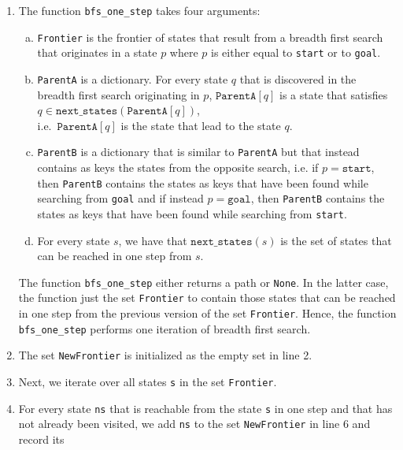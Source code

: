 \begin{enumerate}
\item The function \texttt{bfs\_one\_step} takes four arguments:
      \begin{enumerate}[(a)]
      \item \texttt{Frontier} is the frontier of states that result from a breadth first search
            that originates in a state $p$ where $p$ is either equal to \texttt{start} or to \texttt{goal}.
      \item \texttt{ParentA} is a dictionary.  For every state $q$ that is discovered in the breadth first
            search originating in $p$, $\mathtt{ParentA}[q]$ is a state that satisfies
            \\[0.2cm]
            \hspace*{1.3cm}
            $q \in \mathtt{next\_states}(\mathtt{ParentA}[q])$,
            \\[0.2cm]
            i.e.~$\texttt{ParentA}[q]$ is the state that lead to the state $q$.
      \item \texttt{ParentB} is a dictionary that is similar to \texttt{ParentA} but that instead contains
            as keys the states from the opposite search, i.e. if $p = \mathtt{start}$, then \texttt{ParentB}
            contains the states as keys that have been found while searching from \texttt{goal} and if instead
             $p = \mathtt{goal}$, then \texttt{ParentB} contains the states as keys that have been found while
             searching from \texttt{start}.
      \item For every state $s$, we have that $\texttt{next\_states}(s)$ is the set of states that can be
            reached in one step from $s$.
      \end{enumerate}
      The function \texttt{bfs\_one\_step} either returns a path or \texttt{None}.  In the latter case, the
      function just the set \texttt{Frontier} to contain those states that can be 
      reached in one step from the previous version of the set \texttt{Frontier}.  Hence, the function
      \texttt{bfs\_one\_step} performs one iteration of breadth first search.
\item The set \texttt{NewFrontier} is initialized as the empty set in line 2.
\item Next, we iterate over all states \texttt{s} in the set \texttt{Frontier}.
\item For every state \texttt{ns} that is reachable from the state \texttt{s} in one step and that has not
      already been visited, we add \texttt{ns} to the set \texttt{NewFrontier} in line 6 and record its

\end{enumerate}
